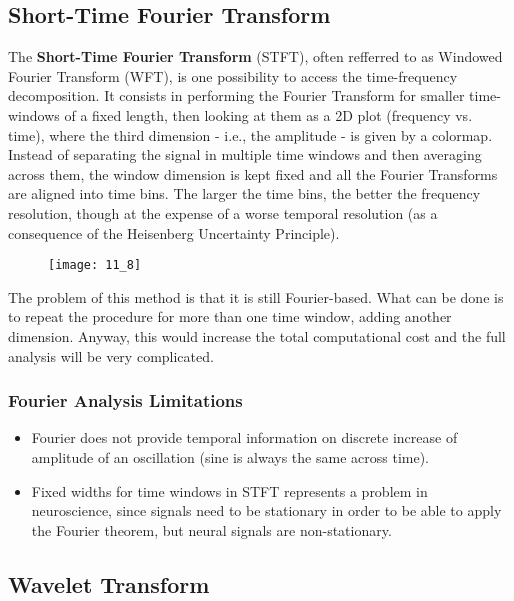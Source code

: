 \subsection{Short-Time Fourier Transform}
The \textbf{Short-Time Fourier Transform} (STFT), often refferred to as Windowed Fourier Transform (WFT),
is one possibility to access the time-frequency decomposition.
It consists in performing the Fourier Transform for smaller time-windows of a fixed length, then looking
at them as a 2D plot (frequency vs. time), where the third dimension - i.e., the amplitude - is given by a
colormap. Instead of separating the signal in multiple time windows and then averaging across them, the window
dimension is kept fixed and all the Fourier Transforms are aligned into time bins. The larger the time bins,
the better the frequency resolution, though at the expense of a worse temporal resolution (as a consequence of the
Heisenberg Uncertainty Principle).
\begin{figure}[H]
    \texttt{[image: 11\_8]}
    \centering
\end{figure}
The problem of this method is that it is still Fourier-based. What can be done is to repeat the procedure for
more than one time window, adding another dimension. Anyway, this would increase the total computational cost
and the full analysis will be very complicated.
\subsubsection{Fourier Analysis Limitations}
\begin{itemize}
    \item Fourier does not provide temporal information on discrete increase of amplitude of an oscillation
          (sine is always the same across time).
    \item Fixed widths for time windows in STFT represents a problem in neuroscience, since signals need to be
          stationary in order to be able to apply the Fourier theorem, but neural signals are non-stationary.
\end{itemize}

\subsection{Wavelet Transform}
